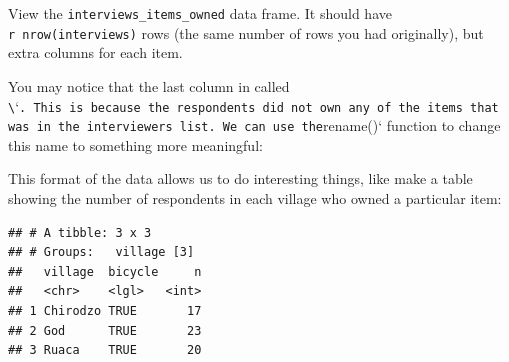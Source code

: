 \documentclass[]{book}
\newenvironment{Shaded}{\begin{snugshade}}{\end{snugshade}}
\newcommand{\KeywordTok}[1]{\textcolor[rgb]{0.13,0.29,0.53}{\textbf{#1}}}
\newcommand{\DataTypeTok}[1]{\textcolor[rgb]{0.13,0.29,0.53}{#1}}
\newcommand{\StringTok}[1]{\textcolor[rgb]{0.31,0.60,0.02}{#1}}
\newcommand{\OtherTok}[1]{\textcolor[rgb]{0.56,0.35,0.01}{#1}}
\newcommand{\OperatorTok}[1]{\textcolor[rgb]{0.81,0.36,0.00}{\textbf{#1}}}
\newcommand{\NormalTok}[1]{#1}
\begin{document}
\begin{Shaded}
\end{Shaded}

View the \texttt{interviews\_items\_owned} data frame. It should have
\texttt{r\ nrow(interviews)} rows (the same number of rows you had
originally), but extra columns for each item.

You may notice that the last column in called
\texttt{\textbackslash{}}`\texttt{.\ This\ is\ because\ the\ respondents\ did\ not\ own\ any\ of\ the\ items\ that\ was\ in\ the\ interviewer\textquotesingle{}s\ list.\ We\ can\ use\ the}rename()`
function to change this name to something more meaningful:

\begin{Shaded}
\end{Shaded}

This format of the data allows us to do interesting things, like make a
table showing the number of respondents in each village who owned a
particular item:

\begin{Shaded}
\end{Shaded}

\begin{verbatim}
## # A tibble: 3 x 3
## # Groups:   village [3]
##   village  bicycle     n
##   <chr>    <lgl>   <int>
## 1 Chirodzo TRUE       17
## 2 God      TRUE       23
## 3 Ruaca    TRUE       20
\end{verbatim}
\end{document}
